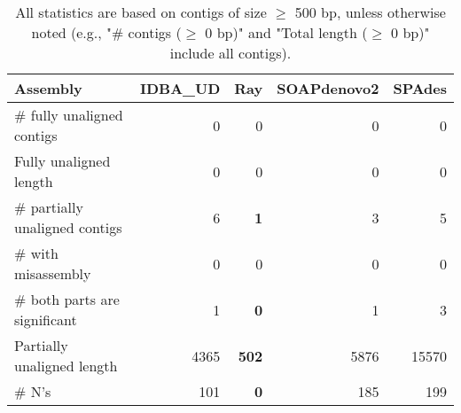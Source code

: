 \documentclass[12pt,a4paper]{article}
\begin{document}
\begin{table}[ht]
\begin{center}
\caption{All statistics are based on contigs of size $\geq$ 500 bp, unless otherwise noted (e.g., "\# contigs ($\geq$ 0 bp)" and "Total length ($\geq$ 0 bp)" include all contigs).}
\begin{tabular}{|l*{4}{|r}|}
\hline
Assembly & IDBA\_UD & Ray & SOAPdenovo2 & SPAdes \\ \hline
\# fully unaligned contigs & 0 & 0 & 0 & 0 \\ \hline
Fully unaligned length & 0 & 0 & 0 & 0 \\ \hline
\# partially unaligned contigs & 6 & {\bf 1} & 3 & 5 \\ \hline
\hspace{5mm}\# with misassembly & 0 & 0 & 0 & 0 \\ \hline
\hspace{5mm}\# both parts are significant & 1 & {\bf 0} & 1 & 3 \\ \hline
Partially unaligned length & 4365 & {\bf 502} & 5876 & 15570 \\ \hline
\# N's & 101 & {\bf 0} & 185 & 199 \\ \hline
\end{tabular}
\end{center}
\end{table}
\end{document}
